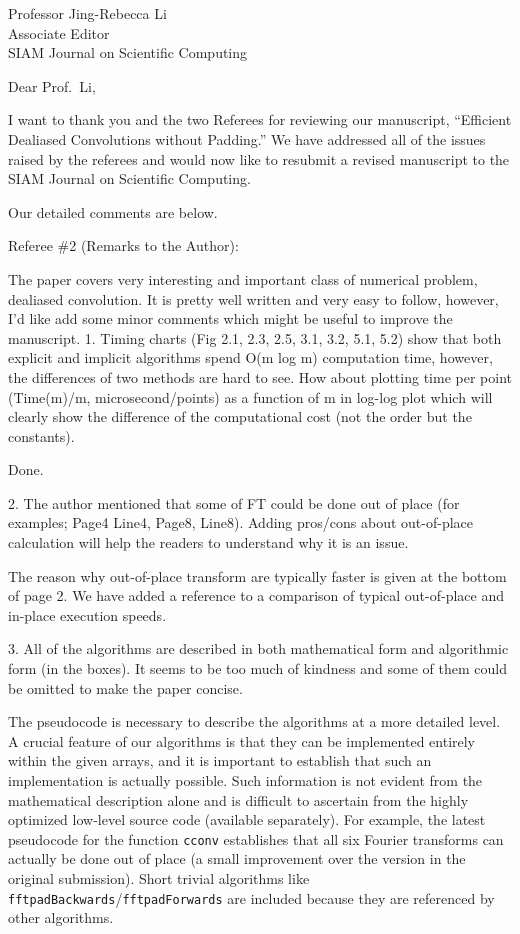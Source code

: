 \documentclass[11pt]{letter}
\begin{document}
\def\bq{\par\color{red}}
\def\eq{\color{black}}

\begin{letter}
{Professor Jing-Rebecca Li\\ 
Associate Editor\\
SIAM Journal on Scientific Computing 
}
\opening{Dear Prof.\ Li,}
I want to thank you and the two Referees for reviewing our manuscript,
``Efficient Dealiased Convolutions without Padding.''
We have addressed all of the issues raised by the referees and would now
like to resubmit a revised manuscript to the SIAM Journal on Scientific
Computing.

Our detailed comments are below.

\bq
Referee \#2 (Remarks to the Author): 
 
The paper covers very interesting and important class of numerical problem, dealiased convolution. It is pretty well written and very easy to follow, however, I'd like add some minor comments which might be useful to improve the manuscript. 
1. Timing charts (Fig 2.1, 2.3, 2.5, 3.1, 3.2, 5.1, 5.2) show that both explicit and implicit algorithms spend O(m log m) computation time, however, the differences of two methods are hard to see. How about plotting time per point (Time(m)/m, microsecond/points) as a function of m in log-log plot which will clearly show the difference of the computational cost (not the order but the constants). 
\eq

Done.

\bq
2. The author mentioned that some of FT could be done out of place (for examples; Page4 Line4, Page8, Line8). Adding pros/cons about out-of-place calculation will help the readers to understand why it is an issue. 
\eq

The reason why out-of-place transform are typically faster is given at the
bottom of page 2. We have added a reference to a comparison of
typical out-of-place and in-place execution speeds.

\bq
3. All of the algorithms are described in both mathematical form and algorithmic form (in the boxes). It seems to be too much of kindness and some of them could be omitted to make the paper concise. 
\eq

The pseudocode is necessary to describe the algorithms at a more detailed level.
A crucial feature of our algorithms is that they can be implemented
entirely within the given arrays, and it is important to establish that
such an implementation is actually possible. Such information is not
evident from the mathematical description alone and is difficult to ascertain
from the highly optimized low-level source code (available separately). 
For example, the latest pseudocode for the function {\tt cconv} establishes
that all six Fourier transforms can actually be done out of place (a small
improvement over the version in the original submission). Short trivial
algorithms like {\tt fftpadBackwards}/{\tt fftpadForwards} are included
because they are referenced by other algorithms.


\end{letter}
\end{document}
